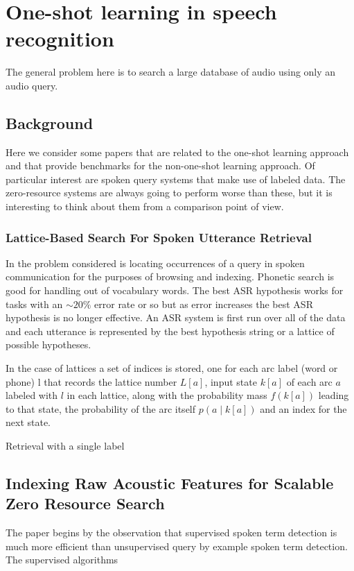\chapter{One-shot learning in speech recognition}

The general problem here is to search a large database of audio using only an audio query.

\section{Background}

Here we consider some papers that are related to the one-shot learning approach and that
provide benchmarks for the non-one-shot learning approach.  Of particular interest
are spoken query systems that make use of labeled data.  The zero-resource systems
are always going to perform worse than these, but it is interesting to think about them from a comparison
point of view.

\subsection{Lattice-Based Search For Spoken Utterance Retrieval}

In \cite{saraclar2004lattice} the problem considered is locating occurrences of
a query in spoken communication for the purposes of browsing and indexing.
Phonetic search is good for handling out of vocabulary words.  The best ASR hypothesis
works for tasks with an $\sim20\%$ error rate or so but as error increases
the best ASR hypothesis is no longer effective.  An ASR system is first run over
all of the data and each utterance is represented by the best hypothesis string
or a lattice of possible hypotheses.

In the case of lattices a set of indices is stored, one for each arc label (word or phone) l that records
the lattice number $L[a]$, input state $k[a]$ of each arc $a$
labeled with $l$ in each lattice, along with the probability mass $f(k[a])$
leading to that state, the probability of the arc itself $p(a\mid k[a])$ and an index for the next state.

Retrieval with a single label 

\section{Indexing Raw Acoustic Features for Scalable Zero Resource Search}

The paper \cite{jansen2012indexing} begins by the observation that supervised spoken term detection is much more efficient
than unsupervised query by example spoken term detection.  The supervised algorithms
